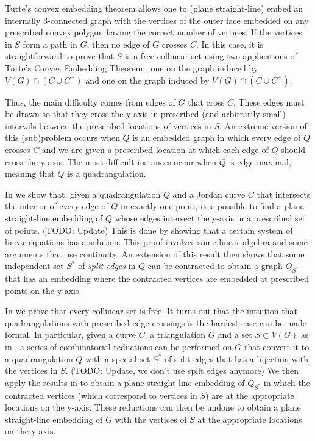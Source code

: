 \documentclass{patmorin}
\begin{document}
Tutte's convex embedding theorem \cite{tutte:how} allows one to (plane
straight-line) embed an internally 3-connected graph with the vertices
of the outer face embedded on any prescribed convex polygon having the
correct number of vertices.  If the vertices in $S$ form a path in $G$,
then no edge of $G$ crosses $C$. In this case, it is straightforward to
prove that $S$ is a free collinear set using two applications of Tutte's
Convex Embedding Theorem \cite{tutte:how}, one on the graph induced by
$V(G)\cap(C\cup C^-)$ and one on the graph induced by $V(G)\cap(C\cup
C^+)$.

Thus, the main difficulty comes from edges of $G$ that cross $C$.
These edges must be drawn so that they cross the y-axis in prescribed
(and arbitrarily small) intervals between the prescribed locations of vertices
in $S$.  An extreme version of this (sub)problem occurs when $Q$ is an
embedded graph in which every edge of $Q$ crosses $C$ and we are given a
prescribed location at which each edge of $Q$ should cross the y-axis.
The most difficult instances occur when $Q$ is edge-maximal, meaning
that $Q$ is a quadrangulation.

In  we show that, given a quadrangulation $Q$
and a Jordan curve $C$ that intersects the interior of every edge of
$Q$ in exactly one point, it is possible to find a plane straight-line
embedding of $Q$ whose edges intersect the y-axis in a prescribed set
of points.  
(TODO:  Update) This is done by showing that a certain system of linear
equations has a solution. This proof involves some linear algebra and
some arguments that use continuity.  An extension of this result then
shows that some independent set $S^*$ of \emph{split edges} in $Q$ can
be contracted to obtain a graph $Q_{S^*}$ that has an embedding where
the contracted vertices are embedded at prescribed points on the y-axis.

In  we prove that every collinear set is free.
It turns out that the intuition that quadrangulations with prescribed
edge crossings is the hardest case can be made formal. In particular,
given a curve $C$, a triangulation $G$ and a set $S\subset V(G)$ as
in , a series of combinatorial reductions can be
performed on $G$ that convert it to a quadrangulation $Q$ with a special
set $S^*$ of split edges that has a bijection with the vertices in $S$.
(TODO: Update, we don't use split edges anymore)
We then apply the results in  to obtain a plane
straight-line embedding of $Q_{S^*}$ in which the contracted vertices
(which correspond to vertices in $S$) are at the appropriate locations
on the y-axis. These reductions can then be undone to obtain a plane
straight-line embedding of $G$ with the vertices of $S$ at the appropriate
locations on the y-axis.
\end{document}
